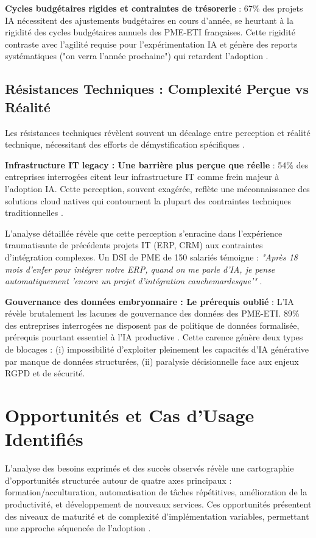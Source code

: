 \textbf{Cycles budgétaires rigides et contraintes de trésorerie} : 67\% des projets IA nécessitent des ajustements budgétaires en cours d'année, se heurtant à la rigidité des cycles budgétaires annuels des PME-ETI françaises. Cette rigidité contraste avec l'agilité requise pour l'expérimentation IA et génère des reports systématiques ("on verra l'année prochaine") qui retardent l'adoption \cite{anthony2020budget}.

\subsection{Résistances Techniques : Complexité Perçue vs Réalité}

Les résistances techniques révèlent souvent un décalage entre perception et réalité technique, nécessitant des efforts de démystification spécifiques \cite{davis1989perceived}.

\textbf{Infrastructure IT legacy : Une barrière plus perçue que réelle} : 54\% des entreprises interrogées citent leur infrastructure IT comme frein majeur à l'adoption IA. Cette perception, souvent exagérée, reflète une méconnaissance des solutions cloud natives qui contournent la plupart des contraintes techniques traditionnelles \cite{aws2024cloud}.

L'analyse détaillée révèle que cette perception s'enracine dans l'expérience traumatisante de précédents projets IT (ERP, CRM) aux contraintes d'intégration complexes. Un DSI de PME de 150 salariés témoigne : \emph{"Après 18 mois d'enfer pour intégrer notre ERP, quand on me parle d'IA, je pense automatiquement 'encore un projet d'intégration cauchemardesque'"} \cite{luwai2025meetings}.

\textbf{Gouvernance des données embryonnaire : Le prérequis oublié} : L'IA révèle brutalement les lacunes de gouvernance des données des PME-ETI. 89\% des entreprises interrogées ne disposent pas de politique de données formalisée, prérequis pourtant essentiel à l'IA productive \cite{wang2019data}. Cette carence génère deux types de blocages : (i) impossibilité d'exploiter pleinement les capacités d'IA générative par manque de données structurées, (ii) paralysie décisionnelle face aux enjeux RGPD et de sécurité.

\section{Opportunités et Cas d'Usage Identifiés}

L'analyse des besoins exprimés et des succès observés révèle une cartographie d'opportunités structurée autour de quatre axes principaux : formation/acculturation, automatisation de tâches répétitives, amélioration de la productivité, et développement de nouveaux services. Ces opportunités présentent des niveaux de maturité et de complexité d'implémentation variables, permettant une approche séquencée de l'adoption \cite{moore2014crossing}.

